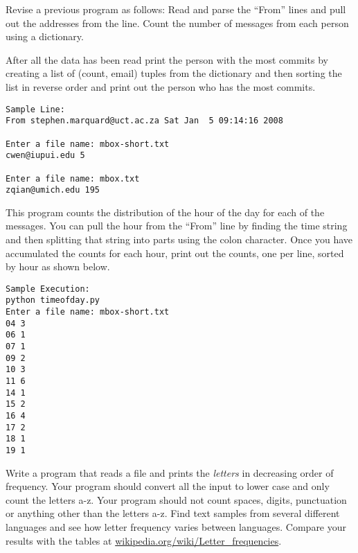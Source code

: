 \begin{ex}
Revise a previous program as follows:  Read and 
parse the ``From'' lines and pull out the 
addresses from the line.   Count the number of
messages from each person using a dictionary.

After all the data has been read print 
the person with the most commits by creating
a list of (count, email) tuples from the 
dictionary and then sorting the list in reverse
order and print out the person who has the most
commits.

\beforeverb
\begin{verbatim}
Sample Line:
From stephen.marquard@uct.ac.za Sat Jan  5 09:14:16 2008

Enter a file name: mbox-short.txt
cwen@iupui.edu 5

Enter a file name: mbox.txt
zqian@umich.edu 195
\end{verbatim}
\afterverb
\end{ex}
\begin{ex}
This program counts the distribution of the hour of the day for 
each of the messages. You can pull the hour from the ``From'' 
line by finding the time string and then splitting that string 
into parts using the colon character. Once you have accumulated 
the counts for each hour, print out the counts, one per line, 
sorted by hour as shown below. 
\beforeverb
\begin{verbatim}
Sample Execution:
python timeofday.py
Enter a file name: mbox-short.txt
04 3
06 1
07 1
09 2
10 3
11 6
14 1
15 2
16 4
17 2
18 1
19 1
\end{verbatim}
\afterverb
\end{ex}


\begin{ex}
Write a program that reads a file and 
prints the {\em letters} in decreasing order of frequency.  Your program
should convert all the input to lower case and only count the letters a-z.
Your program should not count spaces, digits, punctuation or anything 
other than the letters a-z.
Find text samples from several different languages and see how letter frequency
varies between languages.  Compare your results with the tables at
\url{wikipedia.org/wiki/Letter_frequencies}.


\end{ex}

